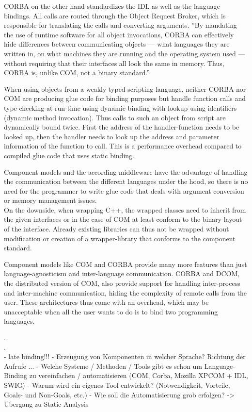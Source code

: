 CORBA on the other hand standardizes the IDL as well as the language bindings. All calls are routed through the Object Request Broker, which is responsible for translating the calls and converting arguments. ''By mandating the use of runtime software for all object invocations, CORBA can effectively hide differences between communicating objects — what languages they are written in, on what machines they are running and the operating system used — without requiring that their interfaces all look the same in memory. Thus, CORBA is, unlike COM, not a binary standard.''

When using objects from a weakly typed scripting language, neither CORBA nor COM are producing glue code for binding purposes but handle function calls and type-checking at run-time using dynamic binding with lookup using identifiers (dynamic method invocation). Thus calls to such an object from script are dynamically bound twice. First the address of the handler-function needs to be looked up, then the handler needs to look up the address and parameter information of the function to call. This is a performance overhead compared to compiled glue code that uses static binding.

Component models and the according middleware have the advantage of handling the communication between the different languages under the hood, so there is no need for the programmer to write glue code that deals with argument conversion or memory management issues.\\
On the downside, when wrapping C++, the wrapped classes need to inherit from the given interfaces or in the case of COM at least conform to the binary layout of the interface. Already existing libraries can thus not be wrapped without modification or creation of a wrapper-library that conforms to the component standard.

Component models like COM and CORBA provide many more features than just language-agnosticism and inter-language communication. CORBA and DCOM, the distributed version of COM, also provide support for handling inter-process and inter-machine communication, hiding the complexity of remote calls from the user. These architectures thus come with an overhead, which may be unacceptable when all the user wants to do is to bind two programming languages.


.\\
.\\
  - late binding!!!
  - Erzeugung von Komponenten in welcher Sprache? Richtung der Aufrufe ...
  - Welche Systeme / Methoden / Tools gibt es schon um Language-Binding zu vereinfachen / automatisieren (COM, Corba, Mozilla XPCOM + IDL, SWIG)
  - Warum wird ein eigenes Tool entwickelt? (Notwendigkeit, Vorteile, Goals- und Non-Goals, etc.)
  - Wie soll die Automatisierung grob erfolgen? -> Übergang zu Static Analysis